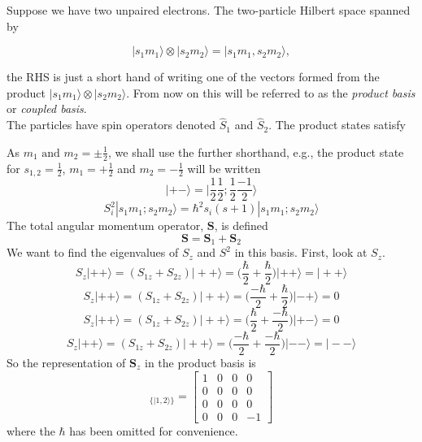 \documentclass[12pt]{article}
\begin{document}
\noindent Suppose we have two unpaired electrons. The two-particle Hilbert
space spanned by

\begin{equation} |s_{1}m_{1}\rangle \otimes | s_{2}m_{2} \rangle = |
s_{1}m_{1}, s_{2}m_{2} \rangle,
\end{equation}

\noindent the RHS is just a short hand of writing one of the vectors formed
from the product $|s_{1}m_{1}\rangle \otimes | s_{2}m_{2} \rangle$. From now on this will be referred to as the
\emph{product basis} or \emph{coupled basis}. \\

\noindent The particles have spin operators denoted $\hat{S}_{1}$ and
$\hat{S}_{2}$. The product states satisfy

\noindent As $m_{1}  \text{ \ and\ } m_{2} = \pm \frac{1}{2} $, we shall use the
further shorthand, e.g., the product state for $s_{1,2} = \frac{1}{2}$, $m_{1}
= +\frac{1}{2}$  and  $m_{2} = -\frac{1}{2} $ will be written
\begin{equation}
|+-\rangle = \Bigg| \frac{1}{2}\frac{1}{2};\frac{1}{2}\frac{-1}{2} \Bigg\rangle
\end{equation}
\begin{equation}
S^{2}_{i}|s_{1}m_{1}; s_{2}m_{2} \rangle = \hbar^{2}s_{i}(s+1)|s_{1}m_{1}; s_{2}m_{2} \rangle
\end{equation}
\noindent The total angular momentum operator, $\mathbf{S}$, is defined 
\begin{equation}
\mathbf{S} = \mathbf{S}_{1}+\mathbf{S}_{2}
\end{equation}
We want to find the eigenvalues of $S_{z}$ and $S^{2}$ in this basis. First, look at
$S_{z}$.
\begin{equation}
S_{z}|++\rangle =
(S_{1z}+S_{2z})|++\rangle = \Bigg(\frac{\hbar}{2} + \frac{\hbar}{2}\Bigg) | ++ \rangle = |++\rangle
\end{equation}
\begin{equation}
S_{z}|++\rangle =
(S_{1z}+S_{2z})|++\rangle = \Bigg(\frac{-\hbar}{2} + \frac{\hbar}{2}\Bigg) | -+ \rangle = 0
\end{equation}
\begin{equation}
S_{z}|++\rangle =
(S_{1z}+S_{2z})|++\rangle = \Bigg(\frac{\hbar}{2} + \frac{-\hbar}{2}\Bigg) | +- \rangle = 0
\end{equation}
\begin{equation}
S_{z}|++\rangle = 
(S_{1z}+S_{2z})|++\rangle = \Bigg(\frac{-\hbar}{2} + \frac{-\hbar}{2}\Bigg) | -- \rangle = | -- \rangle
\end{equation}
So the representation of $\mathbf{S}_{z}$ in the product basis is
\begin{equation}
[S_{z}]_{\{|1,2\rangle\}} = 
\begin{bmatrix}
1                  & 0 & 0 & 0 \\
0                  & 0 & 0 & 0 \\
0                  & 0 & 0 & 0 \\
0                  & 0 & 0 & -1 
\end{bmatrix}
\end{equation}
where the $\hbar$ has been omitted for convenience.\\
\end{document}
